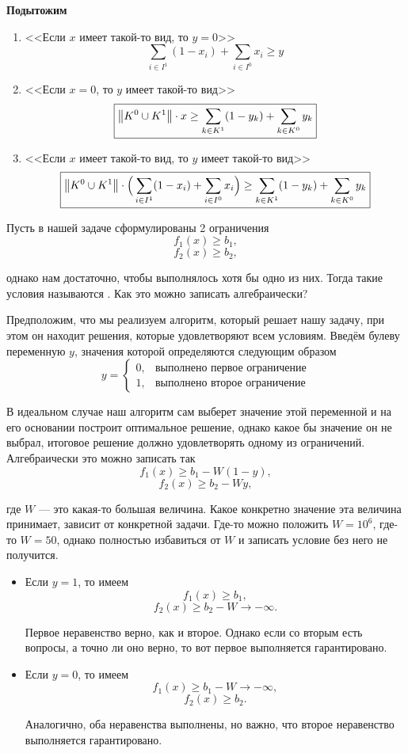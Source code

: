 \textbf{Подытожим}
\begin{enumerate}
	\item <<Если $x$ имеет такой-то вид, то $y = 0$>>
	\[
	\boxed{\sum_{i \in I^1}(1-x_i) + \sum_{i \in I^0}x_i \ge y}
	\]
	
	\item <<Если $x = 0$, то $y$ имеет такой-то вид>>
	\[
	\boxed{\norm{K^0 \cup K^1} \cdot x  \ge \sum_{k \in K^1}(1-y_k) + \sum_{k \in K^0}y_k}
	\]
	
	\item <<Если $x$ имеет такой-то вид, то $y$ имеет такой-то вид>>
	\[
	\boxed{\norm{K^0 \cup K^1} \cdot \Big(\sum_{i \in I^1}(1-x_i) + \sum_{i \in I^0}x_i\Big) \ge \sum_{k \in K^1}(1-y_k) + \sum_{k \in K^0}y_k}
	\]
\end{enumerate}

\label{fact:alternative_conditions}

Пусть в нашей задаче сформулированы 2 ограничения
\[f_1(x) \ge b_1,\]
\[f_2(x) \ge b_2,\]

однако нам достаточно, чтобы выполнялось хотя бы одно из них. Тогда такие условия называются . Как это можно записать алгебраически?

Предположим, что мы реализуем алгоритм, который решает нашу задачу, при этом он находит решения, которые удовлетворяют всем условиям. Введём булеву переменную $y$, значения которой определяются следующим образом 
\[
y = \begin{cases}
	0,& \text{выполнено первое ограничение}\\
	1,&\text{выполнено второе ограничение}
\end{cases}
\]

В идеальном случае наш алгоритм сам выберет значение 
этой переменной и на его основании построит оптимальное решение, однако какое бы значение он не выбрал, итоговое решение должно удовлетворять одному из ограничений. Алгебраически это можно записать так
\[f_1(x) \ge b_1 - W(1-y),\]
\[f_2(x) \ge b_2 - Wy,\]

где $W$ --- это какая-то большая величина. Какое конкретно значение эта величина принимает, зависит от конкретной задачи. Где-то можно положить $W = 10^6$, где-то $W = 50$, однако полностью избавиться от $W$ и записать условие без него не получится.

\begin{itemize}[nosep]
	\item Если $y = 1$, то имеем
	\[f_1(x) \ge b_1,\]
	\[f_2(x) \ge b_2 - W \to -\infty.\]
	
	Первое неравенство верно, как и второе. Однако если со вторым есть вопросы, а точно ли оно верно, то вот первое выполняется гарантировано.
	
	\item Если $y = 0$, то имеем
	\[f_1(x) \ge b_1 - W \to -\infty,\]
	\[f_2(x) \ge b_2.\]
	
	Аналогично, оба неравенства выполнены, но важно, что второе неравенство выполняется гарантировано.
	
\end{itemize}

